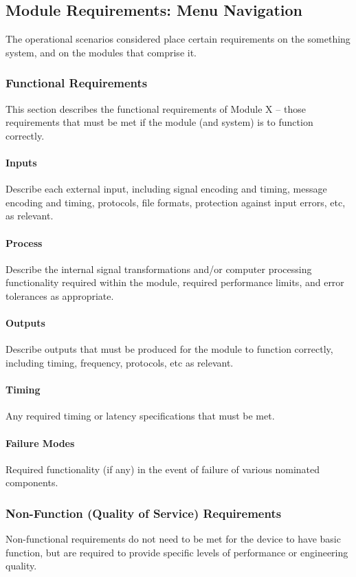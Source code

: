 \documentclass[MTRX3700report.tex]{subfiles}
\begin{document}
\subsection{Module Requirements: Menu Navigation}
The operational scenarios considered place certain requirements on the something system, and on the modules that comprise it.
\subsubsection{Functional Requirements}
This section describes the functional requirements of Module X – those requirements that must be met if the module (and system) is to function correctly.  

\paragraph{Inputs}
Describe each external input, including signal encoding and timing, message encoding and timing, protocols, file formats, protection against input errors, etc, as relevant.
\paragraph{Process}
Describe the internal signal transformations and/or computer processing functionality required within the module, required performance limits, and error tolerances as appropriate.
\paragraph{Outputs}
Describe outputs that must be produced for the module to function correctly, including timing, frequency, protocols, etc as relevant.
\paragraph{Timing}
Any required timing or latency specifications that must be met.
\paragraph{Failure Modes}
Required functionality (if any) in the event of failure of various nominated components.

\subsubsection{Non-Function (Quality of Service) Requirements}
Non-functional requirements do not need to be met for the device to have basic function, but are required to provide specific levels of performance or engineering quality.
\end{document}
